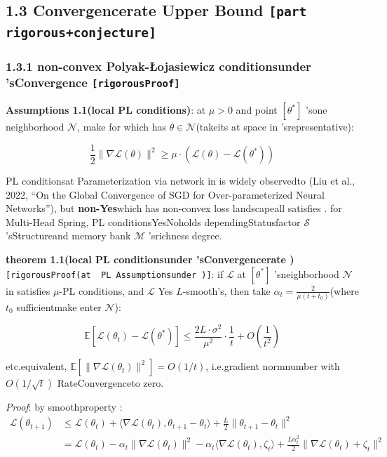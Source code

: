 \documentclass[
  12pt,
]{article}
\begin{document}
\subsection{\texorpdfstring{1.3 Convergencerate Upper Bound
\texttt{{[}part rigorous+conjecture{]}}}{1.3 Convergencerate Upper Bound {[}part rigorous+conjecture{]}}}\label{ux6536ux655bux7387ux4e0aux754c-ux90e8ux5206ux4e25ux683cux731cux60f3}

\subsubsection{\texorpdfstring{1.3.1 non-convex Polyak-Łojasiewicz
conditionsunder 'sConvergence
\texttt{{[}rigorousProof{]}}}{1.3.1 non-convex Polyak-Łojasiewicz conditionsunder 'sConvergence {[}rigorousProof{]}}}\label{ux975eux51f8-polyak-ux142ojasiewicz-ux6761ux4ef6ux4e0bux7684ux6536ux655b-ux4e25ux683cux8bc1ux660e}

\textbf{Assumptions 1.1(local  PL conditions)}: at  \(\mu > 0\) and point 
\([\theta^*]\) 'sone neighborhood \(\mathcal{N}\), make for which has 
\(\theta \in \mathcal{N}\)(takeits at space in 'srepresentative):

\[\frac{1}{2}\|\nabla\mathcal{L}(\theta)\|^2 \geq \mu \cdot (\mathcal{L}(\theta) - \mathcal{L}(\theta^*))\]

PL conditionsat Parameterization via network in is widely observedto (Liu et al., 2022, ``On the
Global Convergence of SGD for Over-parameterized Neural
Networks''), but \textbf{non-Yes}which has non-convex loss landscapeall satisfies . for  Multi-Head
Spring, PL conditionsYesNoholds dependingStatusfactor  \(\mathcal{S}\) 'sStructureand memory bank
\(\mathcal{M}\) 'srichness degree. 

\textbf{theorem  1.1(local  PL conditionsunder 'sConvergencerate )}
\texttt{{[}rigorousProof(at \ PL\ Assumptionsunder ){]}}: if  \(\mathcal{L}\) at 
\([\theta^*]\) 'sneighborhood \(\mathcal{N}\) in satisfies  \(\mu\)-PL conditions, and 
\(\mathcal{L}\) Yes \(L\)-smooth's, then take
\(\alpha_t = \frac{2}{\mu(t + t_0)}\)(where \(t_0\) sufficientmake enter
\(\mathcal{N}\)): 

\[\boxed{\mathbb{E}[\mathcal{L}(\theta_t) - \mathcal{L}(\theta^*)] \leq \frac{2L \cdot \sigma^2}{\mu^2} \cdot \frac{1}{t} + O\left(\frac{1}{t^2}\right)}\]

etc.equivalent, \(\mathbb{E}[\|\nabla\mathcal{L}(\theta_t)\|^2] = O(1/t)\), i.e.gradient normnumber with 
\(O(1/\sqrt{t})\) RateConvergenceto zero. 

\emph{Proof}: by smoothproperty :  \begin{align*}
\mathcal{L}(\theta_{t+1}) &\leq \mathcal{L}(\theta_t) + \langle\nabla\mathcal{L}(\theta_t), \theta_{t+1} - \theta_t\rangle + \frac{L}{2}\|\theta_{t+1} - \theta_t\|^2 \\
&= \mathcal{L}(\theta_t) - \alpha_t \|\nabla\mathcal{L}(\theta_t)\|^2 - \alpha_t \langle\nabla\mathcal{L}(\theta_t), \zeta_t\rangle + \frac{L\alpha_t^2}{2}\|\nabla\mathcal{L}(\theta_t) + \zeta_t\|^2
\end{align*}
\end{document}
